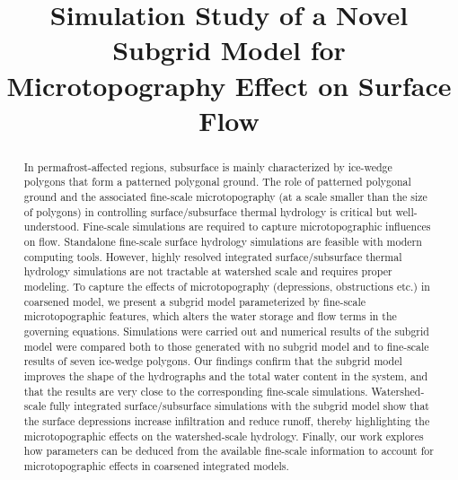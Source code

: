 \documentclass[review,11pt]{elsarticle}
\begin{document}
\begin{frontmatter}

\title{Simulation Study of a Novel Subgrid Model for Microtopography Effect on Surface Flow}







\begin{abstract}
In permafrost-affected regions, subsurface is mainly characterized by ice-wedge polygons that form a patterned polygonal ground. The role of patterned polygonal ground and the associated fine-scale microtopography (at a scale smaller than the size of polygons) in controlling surface/subsurface thermal hydrology is critical but well-understood. Fine-scale simulations are required to capture microtopographic influences on flow. Standalone fine-scale surface hydrology simulations are feasible with modern computing tools. However, highly resolved integrated surface/subsurface thermal hydrology simulations are not tractable at watershed scale and requires proper modeling. To capture the effects of microtopography (depressions, obstructions etc.) in coarsened model, we present a subgrid model parameterized by fine-scale microtopographic features, which alters the water storage and flow terms in the governing equations. Simulations were carried out and numerical results of the subgrid model were compared both to those generated with no subgrid model and to fine-scale results of seven ice-wedge polygons. Our findings confirm that the subgrid model improves the shape of the hydrographs and the total water content in the system, and that the results are very close to the corresponding fine-scale simulations. Watershed-scale fully integrated surface/subsurface simulations with the subgrid model show that the surface depressions increase infiltration and reduce runoff, thereby highlighting the microtopographic effects on the watershed-scale hydrology. Finally, our work explores how parameters can be deduced from the available fine-scale information to account for microtopographic effects in coarsened integrated models.
\end{abstract}


\end{frontmatter}
\end{document}
